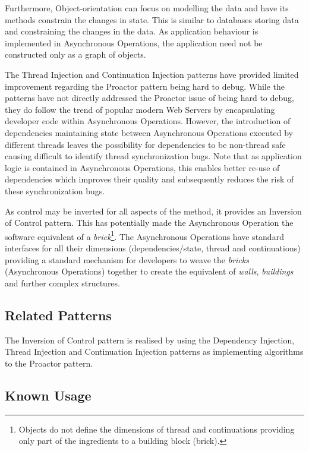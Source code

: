 \documentclass[prodmode]{style/acmlarge}
\begin{document}
Furthermore, Object-orientation can focus on modelling the data and have its
methods constrain the changes in state.  This is similar to databases storing
data and constraining the changes in the data.  As application behaviour is
implemented in Asynchronous Operations, the application need not be constructed
only as a graph of objects.

The Thread Injection and Continuation Injection patterns have provided limited
improvement regarding the Proactor pattern being hard to debug.  While the
patterns have not directly addressed the Proactor issue of being hard to debug,
they do follow the trend of popular modern Web Servers by encapsulating
developer code within Asynchronous Operations.  However, the introduction of
dependencies maintaining state between Asynchronous Operations executed by
different threads leaves the possibility for dependencies to be non-thread safe
causing difficult to identify thread synchronization bugs.  Note that as
application logic is contained in Asynchronous Operations, this enables better
re-use of dependencies which improves their quality and subsequently reduces the
risk of these synchronization bugs.

As control may be inverted for all aspects of the method, it provides an
Inversion of Control pattern.  This has potentially made the Asynchronous
Operation the software equivalent of a \textit{brick}\footnote{Objects do not
define the dimensions of thread and continuations providing only part of the
ingredients to a building block (brick).}.  The Asynchronous Operations have
standard interfaces for all their dimensions (dependencies/state, thread and
continuations) providing a standard mechanism for developers to weave the
\textit{bricks} (Asynchronous Operations) together to create the equivalent of
\textit{walls}, \textit{buildings} and further complex structures.


\subsection{Related Patterns}

The Inversion of Control pattern is realised by using the Dependency Injection,
Thread Injection and Continuation Injection patterns as implementing algorithms
to the Proactor pattern.


\subsection{Known Usage}
\end{document}
